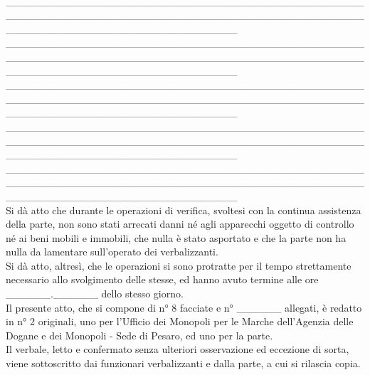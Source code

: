 \documentclass[12pt]{article}
\begin{document}
\\\_\_\_\_\_\_\_\_\_\_\_\_\_\_\_\_\_\_\_\_\_\_\_\_\_\_\_\_\_\_\_\_\_\_\_\_\_\_\_\_\_\_\_\_\_\_\_\_\_\_\_\_\_\_\_\_\_\_\_\_\_\_\_\_\_\_\_\_\_\_\_\_\_\_\_\_\_\_\_\_\_\_\_\_\_\_\_\_\_\_\_\_\_\_\_\_\_\_\_\_\_\_\_\_\_\_\_\_\_\_\_\_\_\_\_\_\_\_\_\_\_\_\_\_\_\_\_ \\\_\_\_\_\_\_\_\_\_\_\_\_\_\_\_\_\_\_\_\_\_\_\_\_\_\_\_\_\_\_\_\_\_\_\_\_\_\_\_\_\_\_\_\_\_\_\_\_\_\_\_\_\_\_\_\_\_\_\_\_\_\_\_\_\_\_\_\_\_\_\_\_\_\_\_\_\_\_\_\_\_\_\_\_\_\_\_\_\_\_\_\_\_\_\_\_\_\_\_\_\_\_\_\_\_\_\_\_\_\_\_\_\_\_\_\_\_\_\_\_\_\_\_\_\_\_\_ \\\_\_\_\_\_\_\_\_\_\_\_\_\_\_\_\_\_\_\_\_\_\_\_\_\_\_\_\_\_\_\_\_\_\_\_\_\_\_\_\_\_\_\_\_\_\_\_\_\_\_\_\_\_\_\_\_\_\_\_\_\_\_\_\_\_\_\_\_\_\_\_\_\_\_\_\_\_\_\_\_\_\_\_\_\_\_\_\_\_\_\_\_\_\_\_\_\_\_\_\_\_\_\_\_\_\_\_\_\_\_\_\_\_\_\_\_\_\_\_\_\_\_\_\_\_\_\_ \\\_\_\_\_\_\_\_\_\_\_\_\_\_\_\_\_\_\_\_\_\_\_\_\_\_\_\_\_\_\_\_\_\_\_\_\_\_\_\_\_\_\_\_\_\_\_\_\_\_\_\_\_\_\_\_\_\_\_\_\_\_\_\_\_\_\_\_\_\_\_\_\_\_\_\_\_\_\_\_\_\_\_\_\_\_\_\_\_\_\_\_\_\_\_\_\_\_\_\_\_\_\_\_\_\_\_\_\_\_\_\_\_\_\_\_\_\_\_\_\_\_\_\_\_\_\_\_ \\\_\_\_\_\_\_\_\_\_\_\_\_\_\_\_\_\_\_\_\_\_\_\_\_\_\_\_\_\_\_\_\_\_\_\_\_\_\_\_\_\_\_\_\_\_\_\_\_\_\_\_\_\_\_\_\_\_\_\_\_\_\_\_\_\_\_\_\_\_\_\_\_\_\_\_\_\_\_\_\_\_\_\_\_\_\_\_\_\_\_\_\_\_\_\_\_\_\_\_\_\_\_\_\_\_\_\_\_\_\_\_\_\_\_\_\_\_\_\_\_\_\_\_\_\_\_\_ \\

Si dà atto che durante le operazioni di verifica, svoltesi con la continua assistenza della parte, non sono stati arrecati danni né agli apparecchi oggetto di controllo né ai beni mobili e immobili, che nulla è stato asportato e che la parte non ha nulla da lamentare sull’operato dei verbalizzanti.\\
Si dà atto, altresì, che le operazioni si sono protratte per il tempo strettamente necessario allo svolgimento delle stesse, ed hanno avuto termine alle ore \_\_\_\_\_\_.\_\_\_\_\_\_ dello stesso giorno.\\
Il presente atto, che si compone di n° 8 facciate e n° \_\_\_\_\_\_ allegati, è redatto in n° 2 originali, uno per l’Ufficio dei Monopoli per le Marche dell’Agenzia delle Dogane e dei Monopoli - Sede di Pesaro, ed uno per la parte.\\
Il verbale, letto e confermato senza ulteriori osservazione ed eccezione di sorta, viene sottoscritto dai funzionari verbalizzanti e dalla parte, a cui si rilascia copia.
\end{document}
